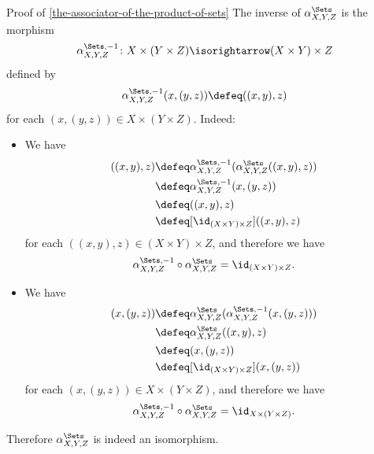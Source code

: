 \begin{Proof}{Proof of \cref{the-associator-of-the-product-of-sets}}%
    The inverse of $\alpha^{\Sets}_{X,Y,Z}$ is the morphism
    \[
        \alpha^{\Sets,-1}_{X,Y,Z}
        \colon
        X\times(Y\times Z)
        \isorightarrow
        (X\times Y)\times Z
    \]%
    defined by
    \[
        \alpha^{\Sets,-1}_{X,Y,Z}(x,(y,z))%
        \defeq%
        ((x,y),z)%
    \]%
    for each $(x,(y,z))\in X\times(Y\times Z)$. Indeed:
    \begin{itemize}
        \item{}We have
            \begin{align*}
                [\alpha^{\Sets,-1}_{X,Y,Z}\circ\alpha^{\Sets}_{X,Y,Z}]((x,y),z) &\defeq \alpha^{\Sets,-1}_{X,Y,Z}(\alpha^{\Sets}_{X,Y,Z}((x,y),z))\\
                                                                                &\defeq \alpha^{\Sets,-1}_{X,Y,Z}(x,(y,z))\\
                                                                                &\defeq ((x,y),z)\\
                                                                                &\defeq [\id_{(X\times Y)\times Z}]((x,y),z)
            \end{align*}
            for each $((x,y),z)\in(X\times Y)\times Z$, and therefore we have
            \[
                \alpha^{\Sets,-1}_{X,Y,Z}\circ\alpha^{\Sets}_{X,Y,Z}%
                =%
                \id_{(X\times Y)\times Z}.%
            \]%
        \item{}We have
            \begin{align*}
                [\alpha^{\Sets}_{X,Y,Z}\circ\alpha^{\Sets,-1}_{X,Y,Z}](x,(y,z)) &\defeq \alpha^{\Sets}_{X,Y,Z}(\alpha^{\Sets,-1}_{X,Y,Z}(x,(y,z)))\\
                                                                                &\defeq \alpha^{\Sets}_{X,Y,Z}((x,y),z)\\
                                                                                &\defeq (x,(y,z))\\
                                                                                &\defeq [\id_{(X\times Y)\times Z}](x,(y,z))
            \end{align*}
            for each $(x,(y,z))\in X\times(Y\times Z)$, and therefore we have
            \[
                \alpha^{\Sets,-1}_{X,Y,Z}\circ\alpha^{\Sets}_{X,Y,Z}%
                =%
                \id_{X\times(Y\times Z)}.%
            \]%
    \end{itemize}
    Therefore $\alpha^{\Sets}_{X,Y,Z}$ is indeed an isomorphism.


\end{Proof}

